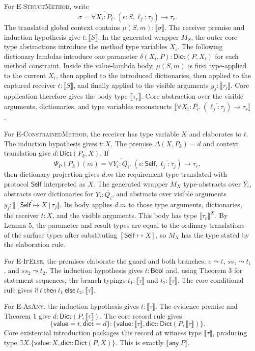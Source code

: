 \documentclass[manuscript,nonacm]{acmart}
\newcommand{\kw}[1]{\ensuremath{\mathsf{#1}}}
\newcommand{\Bool}{\kw{Bool}}
\newcommand{\Self}{\kw{Self}\xspace}
\newcommand{\Any}[1]{\kw{any}\ #1}
\newcommand{\ftype}[3]{\forall #1.\ (#2) \to #3}
\newcommand{\elab}{\leadsto}
\newcommand{\trans}[1]{\llbracket #1 \rrbracket}
\newcommand{\transSelf}[2]{\llbracket #2 \rrbracket^{#1}}
\newcommand{\Dict}{\mathsf{Dict}}
\begin{document}
For \textsc{E-StructMethod}, write
\[
  \sigma=
  \ftype{\overline{X_i:\overline{P_i}}}
         {\epsilon:S,\overline{\ell_j:\tau_j}}
         {\tau_r}.
\]
The translated global context contains
$\mu(S,m):\trans{\sigma}$.
The receiver premise and induction hypothesis give $t:\trans{S}$.
In the generated wrapper $M_S$, the outer core type abstractions introduce the method type variables $X_i$.
The following dictionary lambdas introduce one parameter
$\delta(X_i,P):\Dict(P,X_i)$ for each method constraint.
Inside the value-lambda body, $\mu(S,m)$ is first type-applied to the current $X_i$, then applied to the introduced dictionaries, then applied to the captured receiver $t:\trans{S}$, and finally applied to the visible arguments $\overline{y_j:\trans{\tau_j}}$.
Core application therefore gives the body type $\trans{\tau_r}$.
Core abstraction over the visible arguments, dictionaries, and type variables reconstructs
$\trans{\ftype{\overline{X_i:\overline{P_i}}}{\overline{\ell_j:\tau_j}}{\tau_r}}$.

For \textsc{E-ConstrainedMethod}, the receiver has type variable $X$ and elaborates to $t$.
The induction hypothesis gives $t:X$.
The premise $\Delta(X,P_k)=d$ and context translation give
$d:\Dict(P_k,X)$.
If
\[
  \Psi_P(P_k)(m)=
  \ftype{\overline{Y_i:\overline{Q_i}}}
         {\epsilon:\Self,\overline{\ell_j:\tau_j}}
         {\tau_r},
\]
then dictionary projection gives $d.m$ the requirement type translated with protocol \Self interpreted as $X$.
The generated wrapper $M_X$ type-abstracts over $\overline{Y_i}$, abstracts over dictionaries for $\overline{Y_i:\overline{Q_i}}$, and abstracts over visible arguments
$\overline{y_j:\trans{[\Self\mapsto X]\tau_j}}$.
Its body applies $d.m$ to those type arguments, dictionaries, the receiver $t:X$, and the visible arguments.
This body has type $\transSelf{X}{\tau_r}$.
By Lemma 5, the parameter and result types are equal to the ordinary translations of the surface types after substituting $[\Self\mapsto X]$, so $M_X$ has the type stated by the elaboration rule.

For \textsc{E-IfElse}, the premises elaborate the guard and both branches:
$e\elab t$, $ss_1\elab t_1$, and $ss_2\elab t_2$.
The induction hypothesis gives $t:\Bool$ and, using Theorem 3 for statement sequences, the branch typings
$t_1:\trans{\tau}$ and $t_2:\trans{\tau}$.
The core conditional rule gives
$\kw{if}\ t\ \kw{then}\ t_1\ \kw{else}\ t_2:\trans{\tau}$.

For \textsc{E-AsAny}, the induction hypothesis gives $t:\trans{\tau}$.
The evidence premise and Theorem 1 give $d:\Dict(P,\trans{\tau})$.
The core record rule gives
\[
  \{\kw{value}=t,\kw{dict}=d\}:
  \{\kw{value}:\trans{\tau},\kw{dict}:\Dict(P,\trans{\tau})\}.
\]
Core existential introduction packages this record at witness type $\trans{\tau}$, producing type
$\exists X.\{\kw{value}:X,\kw{dict}:\Dict(P,X)\}$.
This is exactly $\trans{\Any{P}}$.
\end{document}
